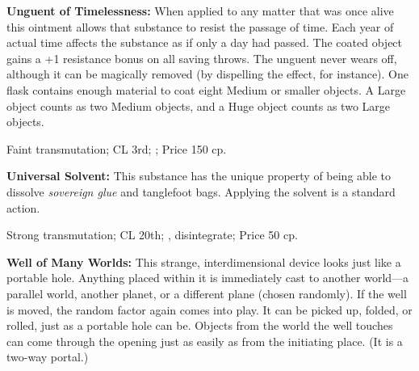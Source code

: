 






\textbf{Unguent of Timelessness:} When applied to any matter that was once alive this ointment allows that substance to resist the passage of time. Each year of actual time affects the substance as if only a day had passed. The coated object gains a +1 resistance bonus on all saving throws. The unguent never wears off, although it can be magically removed (by dispelling the effect, for instance). One flask contains enough material to coat eight Medium or smaller objects. A Large object counts as two Medium objects, and a Huge object counts as two Large objects.

Faint transmutation; CL 3rd; ; Price 150 cp.



\textbf{Universal Solvent:} This substance has the unique property of being able to dissolve \emph{sovereign glue} and tanglefoot bags. Applying the solvent is a standard action.

Strong transmutation; CL 20th; , {disintegrate}; Price 50 cp.



\textbf{Well of Many Worlds:} This strange, interdimensional device looks just like a portable hole. Anything placed within it is immediately cast to another world---a parallel world, another planet, or a different plane (chosen randomly). If the well is moved, the random factor again comes into play. It can be picked up, folded, or rolled, just as a portable hole can be. Objects from the world the well touches can come through the opening just as easily as from the initiating place. (It is a two-way portal.)

